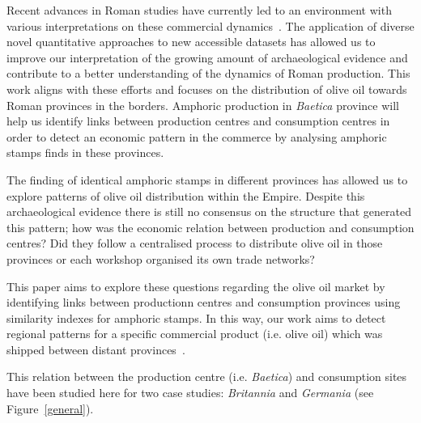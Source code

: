 Recent advances in Roman studies have currently led to an environment with various interpretations on these commercial dynamics~\citep{temin_economy_2006,quantifyingwilson2009}. The application of diverse novel quantitative approaches to new accessible datasets has allowed us to improve our interpretation of the growing amount of archaeological evidence and contribute to a better understanding of the dynamics of Roman production\citep{brughmans_roman_2016,orengo_seeds_2016,bayesian_2018,coto-sarmiento_identifying_2018,rubio-campillo_ecology_2018}. This work aligns with these efforts and focuses on the distribution of olive oil towards Roman provinces in the borders. Amphoric production in \textit{Baetica} province will help us identify links between production centres and consumption centres in order to detect an economic pattern in the commerce by analysing amphoric stamps finds in these provinces. 

The finding of identical amphoric stamps in different provinces has allowed us to explore patterns of olive oil distribution within the Empire. Despite this archaeological evidence there is still no consensus on the structure that generated this pattern; how was the economic relation between production and consumption centres? Did they follow a centralised process to distribute olive oil in those provinces or each workshop organised its own trade networks?
  
This paper aims to explore these questions regarding the olive oil market by identifying links between productionn centres and consumption provinces using similarity indexes for amphoric stamps. In this way, our work aims to detect regional patterns for a specific commercial product (i.e. olive oil) which was shipped between distant provinces~\citep{isaksen_network_2006}. 

This relation between the production centre (i.e. \textit{Baetica}) and consumption sites have been studied here for two case studies: \textit{Britannia} and \textit{Germania} (see Figure~\ref{general}).

